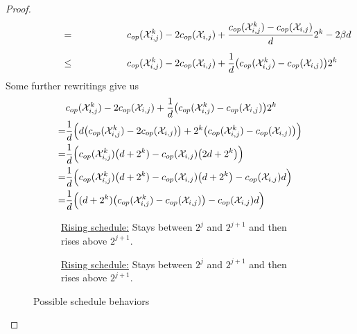 \begin{proof}
\begin{align*}
	\stackrel{\phantom{\eqref{eq:proof_approx_2_inequ}}}{=}&\opcosts(\mx_{i,j}^k)-2\opcosts(\mx_{i,j})+\frac{\opcosts(\mx_{i,j}^k)-\opcosts(\mx_{i,j})}{d}2^k-2\beta d\\
	\stackrel{\phantom{\eqref{eq:proof_approx_2_inequ}}}{\le}&\opcosts(\mx_{i,j}^k)-2\opcosts(\mx_{i,j})+\frac{1}{d}\bigl(\opcosts(\mx_{i,j}^k)-\opcosts(\mx_{i,j})\bigr)2^k
\end{align*}
Some further rewritings give us
\begin{align*}
	&c_{op}(\mathcal{X}_{i,j}^k)-2c_{op}(\mathcal{X}_{i,j})+\frac{1}{d}\bigl(c_{op}(\mathcal{X}_{i,j}^k)-c_{op}(\mathcal{X}_{i,j})\bigr)2^k\\
	=&\frac{1}{d}\Bigl(d\bigl(c_{op}(\mathcal{X}_{i,j}^k)-2c_{op}(\mathcal{X}_{i,j})\bigr)+2^k\bigl(c_{op}(\mathcal{X}_{i,j}^k)-c_{op}(\mathcal{X}_{i,j})\bigr)\Bigr)\\
	=&\frac{1}{d}\Bigl(c_{op}(\mathcal{X}_{i,j}^k)\bigl(d+2^k)-c_{op}(\mathcal{X}_{i,j})\bigl(2d+2^k\bigr)\Bigr)\\
	=&\frac{1}{d}\Bigl(c_{op}(\mathcal{X}_{i,j}^k)\bigl(d+2^k)-c_{op}(\mathcal{X}_{i,j})\bigl(d+2^k\bigr)-c_{op}(\mathcal{X}_{i,j})d\Bigr)\\
	=&\frac{1}{d}\Bigl((d+2^k)\bigl(c_{op}(\mathcal{X}_{i,j}^k)-c_{op}(\mathcal{X}_{i,j})\bigr)-c_{op}(\mathcal{X}_{i,j})d\Bigr)
\end{align*}
\begin{figure}[H]
\captionsetup[subfigure]{labelformat=empty}
\begin{subfigure}[b]{0.47\textwidth}
	
\caption{\underline{Rising schedule:} Stays between $2^j$ and $2^{j+1}$ and then rises above $2^{j+1}$.}
\end{subfigure}
\hfill
\begin{subfigure}[b]{0.47\textwidth}
	
\caption{\underline{Rising schedule:} Stays between $2^j$ and $2^{j+1}$ and then rises above $2^{j+1}$.}
\end{subfigure}
\caption{Possible schedule behaviors}
\end{figure}

\end{proof}
